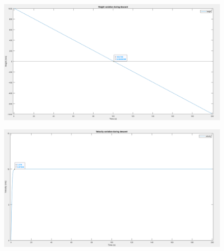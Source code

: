 \documentclass[11pt]{article}
\begin{document}
\begin{enumerate}
\begin{figure}[hbt!]
\includegraphics[width=15cm]{Height_variation}
\centering
\end{figure}

\begin{figure}[hbt!]
\includegraphics[width=15cm]{Velocity_variation}
\centering
\end{figure}

\end{enumerate}
\end{document}
